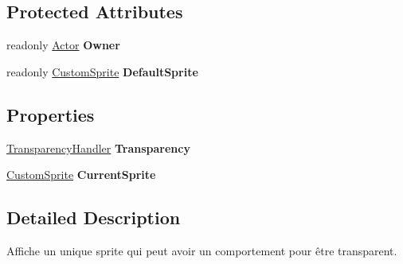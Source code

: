 \subsection*{Protected Attributes}
\begin{DoxyCompactItemize}
\item 
\mbox{\label{class_tentacle_slicers_1_1graphics_1_1_sprite_handler_a6264a34f221658f24789a91029a98ebe}} 
readonly \hyperlink{class_tentacle_slicers_1_1actors_1_1_actor}{Actor} {\bfseries Owner}
\item 
\mbox{\label{class_tentacle_slicers_1_1graphics_1_1_sprite_handler_a6862d59575b523b4a96082677b3db9f9}} 
readonly \hyperlink{class_tentacle_slicers_1_1graphics_1_1_custom_sprite}{Custom\+Sprite} {\bfseries Default\+Sprite}
\end{DoxyCompactItemize}
\subsection*{Properties}
\begin{DoxyCompactItemize}
\item 
\mbox{\label{class_tentacle_slicers_1_1graphics_1_1_sprite_handler_ab61ed27507c5ef3b85544c3019178817}} 
\hyperlink{class_tentacle_slicers_1_1graphics_1_1_transparency_handler}{Transparency\+Handler} {\bfseries Transparency}
\item 
\mbox{\label{class_tentacle_slicers_1_1graphics_1_1_sprite_handler_aea926505e337e12cff161a28bc04da0a}} 
\hyperlink{class_tentacle_slicers_1_1graphics_1_1_custom_sprite}{Custom\+Sprite} {\bfseries Current\+Sprite}
\end{DoxyCompactItemize}


\subsection{Detailed Description}
Affiche un unique sprite qui peut avoir un comportement pour être transparent. 



